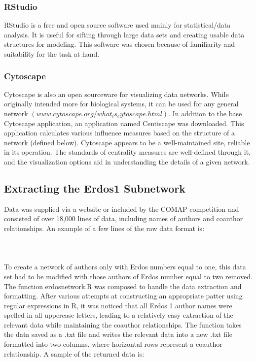 \documentclass[14pt]{article} %
\begin{document}
      \subsubsection{RStudio}
      \indent RStudio is a free and open source software used mainly for statistical/data analysis. It is useful for sifting through large data sets and creating usable data structures for modeling. This software was chosen because of familiarity and suitability for the task at hand. 
      \subsubsection{Cytoscape} 
      \indent Cytoscape is also an open sourceware for visualizing data networks. While originally intended more for biological systems, it can be used for any general network $(www.cytoscape.org/what_is_cytoscape.html)$. In addition to the base Cytoscape application, an application named Centiscape was downloaded. This application calculates various influence measures based on the structure of a network (defined below). Cytoscape appears to be a well-maintained site, reliable in its operation. The standards of centrality measures are well-defined through it, and the visualization options aid in understanding the details of a given network.

  \subsection{Extracting the Erdos1 Subnetwork}
  \indent Data was supplied via a website or included by the COMAP competition and consisted of over 18,000 lines of data, including names of authors and coauthor relationships. An example of a few lines of the raw data format is:\\
  \\
  \hspace{0.5 in}{ABBOTT, HARVEY LESLIE                   1974\\
  \indent Aull, Charles E.\\
  \indent Brown, Ezra A.\\
  \indent Dierker, Paul F.\\
  \indent Exoo, Geoffrey}\\
  \\
  \indent To create a network of authors only with Erdos numbers equal to one, this data set had to be modified with those authors of Erdos number equal to two removed. The function erdosnetwork.R was composed to handle the data extraction and formatting. After various attempts at constructing an appropriate patter using regular expressions in R, it was noticed that all Erdos 1 author names were spelled in all uppercase letters, leading to a relatively easy extraction of the relevant data while maintaining the coauthor relationships. The function takes the data saved as a .txt file and writes the relevant data into a new .txt file formatted into two columns, where horizontal rows represent a coauthor relationship. A sample of the returned data is:\\
  
\end{document}
